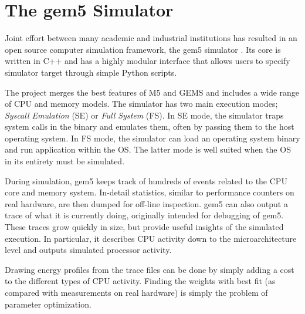 \section{The gem5 Simulator}

Joint effort between many academic and industrial institutions has resulted in
an open source computer simulation framework, the gem5 simulator \cite{gem5,gem5simulator}.
Its core is written in C++ and has a highly modular interface that allows users
to specify simulator target through simple Python scripts.

The project merges the best features of M5 \cite{binkert2006m5} and GEMS \cite{GEMS} and
includes a wide range of CPU and memory models\cite{gem5hipeac}. The simulator has two main
execution modes; \textit{Syscall Emulation} (SE) or \textit{Full System} (FS).
In SE mode, the simulator traps system calls in the binary and emulates them,
often by passing them to the host operating system. In FS mode, the simulator
can load an operating system binary and run application within the OS. The
latter mode is well suited when the OS in its entirety must be simulated.


During simulation, gem5 keeps track of hundreds of events related to the CPU
core and memory system. In-detail statistics, similar to performance counters on
real hardware, are then dumped for off-line inspection. gem5 can also output a
trace of what it is currently doing, originally intended for debugging of gem5.
These traces grow quickly in size, but provide useful insights of the simulated
execution. In particular, it describes CPU activity down to the
microarchitecture level and outputs simulated processor activity.

Drawing energy profiles from the trace files can be done by simply adding a cost
to the different types of CPU activity. Finding the weights with best fit
(as compared with measurements on real hardware) is simply the problem of
parameter optimization.
